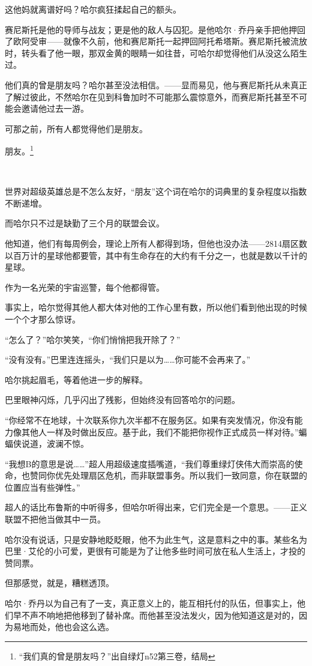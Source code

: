 \documentclass[../main]{subfiles}
\begin{document}
这他妈就离谱好吗？哈尔疯狂揉起自己的额头。

赛尼斯托是他的导师与战友；更是他的敌人与囚犯。是他哈尔·乔丹亲手把他押回了欧阿受审——就像不久前，他和赛尼斯托一起押回阿托希塔斯。赛尼斯托被流放时，转头看了他一眼，那双金黄的眼睛一如往昔，可哈尔却觉得他们从没这么陌生过。

他们真的曾是朋友吗？哈尔甚至没法相信。——显而易见，他与赛尼斯托从未真正了解过彼此，不然哈尔在见到科鲁加时不可能那么震惊意外，而赛尼斯托甚至不可能会邀请他过去一游。

可那之前，所有人都觉得他们是朋友。

朋友。\footnote[1]{“我们真的曾是朋友吗？”出自绿灯n52第三卷，结局}

~\

世界对超级英雄总是不怎么友好，“朋友”这个词在哈尔的词典里的复杂程度以指数不断递增。

而哈尔只不过是缺勤了三个月的联盟会议。

他知道，他们有每周例会，理论上所有人都得到场，但他也没办法——2814扇区数以百万计的星球他都要管，其中有生命存在的大约有千分之一，也就是数以千计的星球。

作为一名光荣的宇宙巡警，每个他都得管。

事实上，哈尔觉得其他人都大体对他的工作心里有数，所以他们看到他出现的时候一个个才那么惊讶。

“怎么了？”哈尔笑笑，“你们悄悄把我开除了？”

“没有没有。”巴里连连摇头，“我们只是以为……你可能不会再来了。”

哈尔挑起眉毛，等着他进一步的解释。

巴里眼神闪烁，几乎闪出了残影，但始终没有回答哈尔的问题。

“你经常不在地球，十次联系你九次半都不在服务区。如果有突发情况，你没有能力像其他人一样及时做出反应。基于此，我们不能把你视作正式成员一样对待。”蝙蝠侠说道，波澜不惊。

“我想B的意思是说……”超人用超级速度插嘴道，“我们尊重绿灯侠伟大而崇高的使命，也赞同你优先处理扇区危机，而非联盟事务。所以我们一致同意，你在联盟的位置应当有些弹性。”

超人的话比布鲁斯的中听得多，但哈尔听得出来，它们完全是一个意思。——正义联盟不把他当做其中一员。

哈尔没有说话，只是安静地眨眨眼，他不为此生气，这是意料之中的事。某些名为巴里·艾伦的小可爱，更很有可能是为了让他多些时间可放在私人生活上，才投的赞同票。

但那感觉，就是，糟糕透顶。

哈尔·乔丹以为自己有了一支，真正意义上的，能互相托付的队伍，但事实上，他们早不声不响地把他移到了替补席。而他甚至没法发火，因为他知道这是对的，因为易地而处，他也会这么选。
\end{document}
